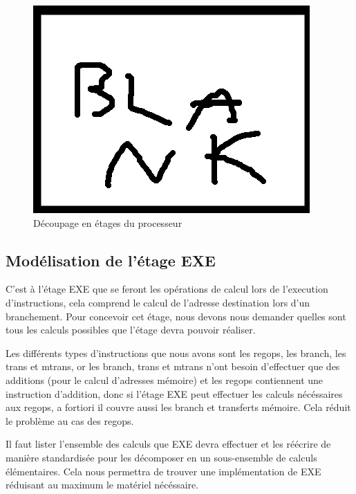 \documentclass{report}
\begin{document}
\begin{figure}[h]
\includegraphics[scale=1]{pics/blank.png}
\centering
\caption{Découpage en étages du processeur}
\label{etages}
\end{figure}

\subsection{Modélisation de l'étage EXE}

C'est à l'étage EXE que se feront les opérations de calcul lors de l'execution d'instructions,
cela comprend le calcul de l'adresse destination lors d'un branchement.
Pour concevoir cet étage, nous devons nous demander quelles sont tous les calculs possibles
que l'étage devra pouvoir réaliser.

Les différents types d'instructions que nous avons sont les regops, les branch, les trans et mtrans,
or les branch, trans et mtrans n'ont besoin d'effectuer que des additions (pour le calcul d'adresses
mémoire) et les regops contiennent une instruction d'addition, donc si l'étage EXE peut effectuer
les calculs nécéssaires aux regops, a fortiori il couvre aussi les branch et transferts mémoire.
Cela réduit le problème au cas des regops.

Il faut lister l'ensemble des calculs que EXE devra effectuer et les réécrire
de manière standardisée pour les décomposer en un sous-ensemble de calculs élémentaires.
Cela nous permettra de trouver une implémentation de EXE réduisant au maximum le matériel nécéssaire.
\end{document}
